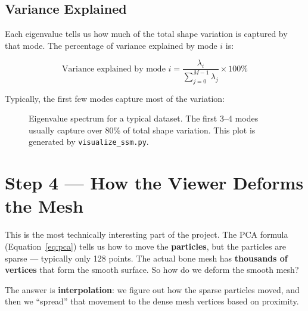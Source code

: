 \documentclass[12pt,a4paper]{article}
\begin{document}
\subsection{Variance Explained}

Each eigenvalue tells us how much of the total shape variation is captured by that mode. The percentage of variance explained by mode $i$ is:

\begin{equation}
\text{Variance explained by mode } i = \frac{\lambda_i}{\sum_{j=0}^{M-1} \lambda_j} \times 100\%
\end{equation}

Typically, the first few modes capture most of the variation:

\begin{figure}[H]
    \centering
    \caption{Eigenvalue spectrum for a typical dataset. The first 3--4 modes usually capture over 80\% of total shape variation. This plot is generated by \texttt{visualize\_ssm.py}.}
    \label{fig:eigenvalue_spectrum}
\end{figure}

\section{Step 4 --- How the Viewer Deforms the Mesh}

This is the most technically interesting part of the project. The PCA formula (Equation~\ref{eq:pca}) tells us how to move the \textbf{particles}, but the particles are sparse --- typically only 128 points. The actual bone mesh has \textbf{thousands of vertices} that form the smooth surface. So how do we deform the smooth mesh?

The answer is \textbf{interpolation}: we figure out how the sparse particles moved, and then we ``spread'' that movement to the dense mesh vertices based on proximity.
\end{document}
